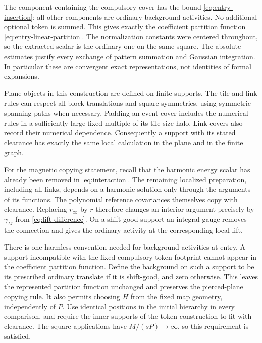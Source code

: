 The component containing the compulsory cover has the bound
\eqref{eq:entry-insertion}; all other components are ordinary
background activities. No additional optional token is summed.
This gives exactly the coefficient partition function
\eqref{eq:entry-linear-partition}. The normalization constants were
centered throughout, so the extracted scalar is the ordinary one
on the same square. The absolute estimates justify every exchange
of pattern summation and Gaussian integration. In particular these
are convergent exact representations, not identities of formal
expansions.

Plane objects in this construction are defined on finite supports.
The tile and link rules can respect all block translations and
square symmetries, using symmetric spanning paths when necessary.
Padding an event cover includes the numerical rules in a sufficiently
large fixed multiple of its tile-size halo. Link covers also record
their numerical dependence. Consequently a support with its stated
clearance has exactly the same local calculation in the plane and
in the finite graph.

For the magnetic copying statement, recall that the harmonic energy
scalar has already been removed in \eqref{eq:interaction}. The
remaining localized preparation, including all links, depends on a
harmonic solution only through the arguments of its functions.
The polynomial reference covariances themselves copy with clearance.
Replacing $r_\infty$ by $r$ therefore changes an interior argument
precisely by $\gamma_M$ from \eqref{eq:lift-difference}. On a
shift-good support an integral gauge removes the connection and
gives the ordinary activity at the corresponding local lift.

There is one harmless convention needed for background activities
at entry. A support incompatible with the fixed compulsory token
footprint cannot appear in the coefficient partition function.
Define the background on such a support to be its prescribed ordinary
translate if it is shift-good, and zero otherwise. This leaves the
represented partition function unchanged and preserves the
pierced-plane copying rule. It also permits choosing $H$ from the
fixed map geometry, independently of $P$. Use identical positions
in the initial hierarchy in every comparison, and require the
inner supports of the token construction to fit with clearance.
The square applications have $M/(sP)\longrightarrow\infty$, so
this requirement is satisfied.

